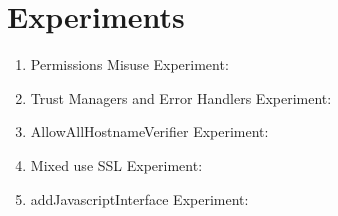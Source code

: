 \section{Experiments}
\label{sec:design}

\begin{enumerate}
    \item Permissions Misuse Experiment:
    \item Trust Managers and Error Handlers
    Experiment: 
    \item AllowAllHostnameVerifier Experiment:
    \item Mixed use SSL Experiment: 
    \item addJavascriptInterface Experiment: 
\end{enumerate}
